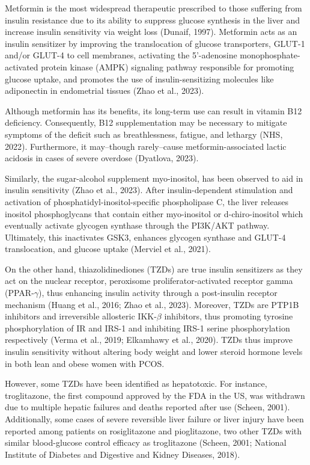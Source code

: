 Metformin is the most widespread therapeutic prescribed to those suffering from insulin resistance due to its ability to suppress glucose synthesis in the liver and increase insulin sensitivity via weight loss (Dunaif, 1997). Metformin acts as an insulin sensitizer by improving the translocation of glucose transporters, GLUT-1 and/or GLUT-4 to cell membranes, activating the  5'-adenosine monophosphate-activated protein kinase (AMPK) signaling pathway responsible for promoting glucose uptake, and promotes the use of insulin-sensitizing molecules like adiponectin in endometrial tissues (Zhao et al., 2023). 

Although metformin has its benefits, its long-term use can result in vitamin B12 deficiency. Consequently, B12 supplementation may be necessary to mitigate symptoms of the deficit such as breathlessness, fatigue, and lethargy (NHS, 2022). Furthermore, it may–though rarely–cause metformin-associated lactic acidosis in cases of severe overdose (Dyatlova, 2023).


Similarly, the sugar-alcohol supplement myo-inositol, has been observed to aid in insulin sensitivity (Zhao et al., 2023). After insulin-dependent stimulation and activation of phosphatidyl-inositol-specific phospholipase C, the liver releases inositol phosphoglycans that contain either myo-inositol or d-chiro-inositol which eventually activate glycogen synthase through the PI3K/AKT pathway. Ultimately, this inactivates GSK3, enhances glycogen synthase and GLUT-4 translocation, and glucose uptake (Merviel et al., 2021).  

On the other hand, thiazolidinediones (TZDs) are true insulin sensitizers as they act on the nuclear receptor, peroxisome proliferator-activated receptor gamma (PPAR-$\gamma$), thus enhancing insulin activity through a post-insulin receptor mechanism (Huang et al., 2016; Zhao et al., 2023). Moreover, TZDs are PTP1B inhibitors and irreversible allosteric IKK-$\beta$ inhibitors, thus promoting tyrosine phosphorylation of IR and IRS-1 and inhibiting IRS-1 serine phosphorylation respectively (Verma et al., 2019; Elkamhawy et al., 2020). TZDs thus improve insulin sensitivity without altering body weight and lower steroid hormone levels in both lean and obese women with PCOS. 

However, some TZDs have been identified as hepatotoxic. For instance, troglitazone, the first compound approved by the FDA in the US, was withdrawn due to multiple hepatic failures and deaths reported after use (Scheen, 2001). Additionally, some cases of severe reversible liver failure or liver injury have been reported among patients on rosiglitazone and pioglitazone, two other TZDs with similar blood-glucose control efficacy as troglitazone (Scheen, 2001; National Institute of Diabetes and Digestive and Kidney Diseases, 2018). 

